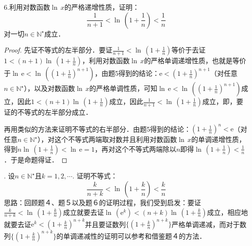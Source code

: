 \documentclass{ctexart}
\theoremstyle{definition}
\theoremstyle{definition}
\theoremstyle{plain}
\theoremstyle{plain}
\theoremstyle{plain}
\theoremstyle{definition}
\begin{document}
\noindent 6.利用对数函数$\ln \, x$的严格递增性质，证明：
\begin{equation}
    \frac{1}{n+1} < \ln \, \left( 1+\frac{1}{n} \right) < \frac{1}{n}
\end{equation}
对一切$n \in \mathbb{N}^\star$成立．
\begin{proof}
先证不等式的左半部分．要证$\displaystyle \frac{1}{n+1} < \ln \, \left( 1+\frac{1}{n} \right)$等价于去证$\displaystyle 1 < (n+1) \ln \, \left( 1+\frac{1}{n} \right)$，利用对数函数$\ln \, x$的严格单调递增性质，也就是等价于$\ln \, \mathrm{e} < \ln \, \left(\left( 1 + \frac{1}{n} \right)^{n+1} \right)$，由题5得到的结论：$\displaystyle \mathrm{e} < \left( 1+\frac{1}{n} \right)^{n+1}$（对任意$n \in \mathbb{N}^\star$），以及对数函数$\ln \, x$的严格单调性质，可知$\ln \, \mathrm{e} < \ln \, \left( \left( 1 + \frac{1}{n} \right)^{n+1} \right)$成立，因此$\displaystyle 1 < (n+1) \ln \, \left( 1+\frac{1}{n} \right)$成立，因此$\displaystyle \frac{1}{n+1} < \ln \, \left( 1 + \frac{1}{n} \right)$成立，即，要证的不等式的左半部分成立．

\noindent 再用类似的方法来证明不等式的右半部分．由题5得到的结论：$\displaystyle \left( 1 + \frac{1}{n} \right)^n < \mathrm{e}$（对任意$n \in \mathbb{N}^\star$），对这个不等式两端取对数并且利用对数函数$\ln \, x$的单调递增性质，得到$\displaystyle n \ln \, \left( 1 + \frac{1}{n} \right) < \ln \, \mathrm{e} = 1$，再对这个不等式两端除以$n$即得$\displaystyle \ln \, \left( 1 + \frac{1}{n}\right) < \frac{1}{n}$．于是命题得证．
\end{proof}
. 设$n \in \mathbb{N}^\star$且$k = 1,2,\cdots$. 证明不等式：
\begin{equation}
    \frac{k}{n+k} < \ln \, \left( 1+\frac{k}{n} \right) < \frac{k}{n}
\end{equation}
\noindent 思路：回顾题４、题５以及题６的证明过程，我们受到启发：要证$\displaystyle \frac{k}{n+k} < \ln \, \left( 1 + \frac{k}{n}\right)$成立就要去证$\displaystyle \ln \, \left( \mathrm{e}^k \right) < (n+k) \ln \, \left( 1 + \frac{k}{n}\right)$成立，相应地就要去证$\displaystyle \mathrm{e}^k < \left(1+\frac{k}{n}\right)^{n+k}$并且要证数列$\displaystyle \{ \left(1+\frac{k}{n}\right)^{n+k} \}$严格单调递减，而对于数列$\displaystyle \{ \left( 1 + \frac{k}{n} \right)^{n+k}\}$的单调递减性的证明可以参考和借鉴题４的方法．
\end{document}
